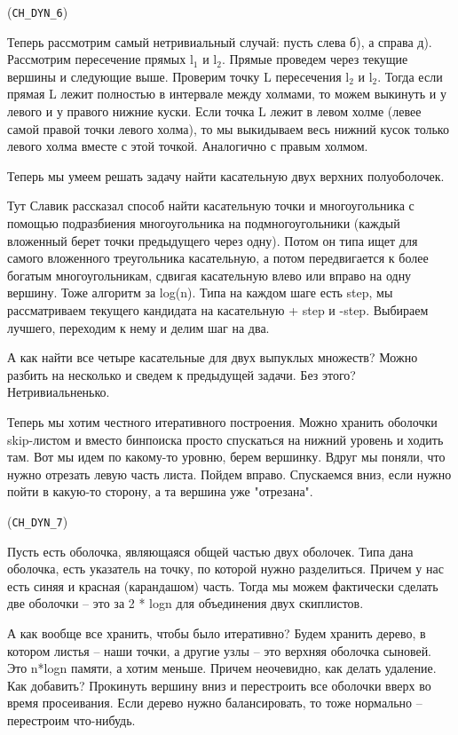 \documentclass[11pt]{article}
\begin{document}
(\texttt{CH\_DYN\_6})

Теперь рассмотрим самый нетривиальный случай: пусть слева б), а
справа д). Рассмотрим пересечение прямых l\(_{\text{1}}\) и l\(_{\text{2}}\). Прямые проведем
через текущие вершины и следующие выше. Проверим точку L пересечения
l\(_{\text{2}}\) и l\(_{\text{2}}\). Тогда если прямая L лежит полностью в интервале между
холмами, то можем выкинуть и у левого и у правого нижние куски. Если
точка L лежит в левом холме (левее самой правой точки левого холма),
то мы выкидываем весь нижний кусок только левого холма вместе с этой
точкой. Аналогично с правым холмом.

Теперь мы умеем решать задачу найти касательную двух верхних
полуоболочек.

Тут Славик рассказал способ найти касательную точки и многоугольника
с помощью подразбиения многоугольника на подмногоугольники (каждый
вложенный берет точки предыдущего через одну). Потом он типа ищет
для самого вложенного треугольника касательную, а потом
передвигается к более богатым многоугольникам, сдвигая касательную
влево или вправо на одну вершину. Тоже алгоритм за log(n). Типа на
каждом шаге есть step, мы рассматриваем текущего кандидата на
касательную + step и -step. Выбираем лучшего, переходим к нему и
делим шаг на два.

А как найти все четыре касательные для двух выпуклых множеств?
Можно разбить на несколько и сведем к предыдущей задачи. Без этого?
Нетривиальненько.



Теперь мы хотим честного итеративного построения. Можно хранить
оболочки skip-листом и вместо бинпоиска просто спускаться на нижний
уровень и ходить там. Вот мы идем по какому-то уровню, берем
вершинку. Вдруг мы поняли, что нужно отрезать левую часть
листа. Пойдем вправо. Спускаемся вниз, если нужно пойти в какую-то
сторону, а та вершина уже "отрезана".

(\texttt{CH\_DYN\_7})

Пусть есть оболочка, являющаяся общей частью двух оболочек. Типа
дана оболочка, есть указатель на точку, по которой нужно
разделиться. Причем у нас есть синяя и красная (карандашом) часть.
Тогда мы можем фактически сделать две оболочки -- это за 2 * logn
для объединения двух скиплистов.

А как вообще все хранить, чтобы было итеративно? Будем хранить
дерево, в котором листья -- наши точки, а другие узлы -- это верхняя
оболочка сыновей. Это n*logn памяти, а хотим меньше. Причем
неочевидно, как делать удаление. Как добавить? Прокинуть вершину
вниз и перестроить все оболочки вверх во время просеивания. Если
дерево нужно балансировать, то тоже нормально -- перестроим
что-нибудь.
\end{document}
